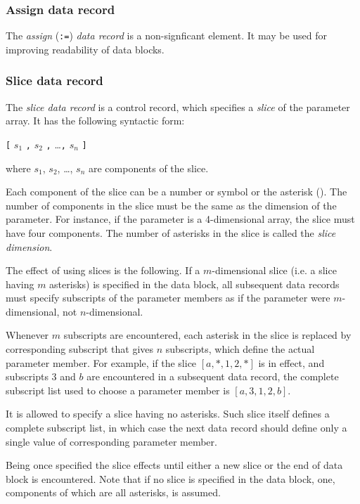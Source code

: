 \documentclass[10pt]{article}
\begin{document}
\subsubsection{Assign data record}

The {\it assign} ({\tt:=}) {\it data record} is a non-signficant
element. It may be used for improving readability of data blocks.

\subsubsection{Slice data record}

The {\it slice data record} is a control record, which specifies a
{\it slice} of the parameter array. It has the following syntactic form:

\medskip

\noindent\hfil
{\tt[} $s_1$ {\tt,} $s_2$ {\tt,} \dots {\tt,} $s_n$ {\tt]}

\medskip

\noindent where $s_1$, $s_2$, \dots, $s_n$ are components of the slice.

Each component of the slice can be a number or symbol or the asterisk
({\tt*}). The number of components in the slice must be the same as the
dimension of the parameter. For instance, if the parameter is a
4-dimensional array, the slice must have four components. The number of
asterisks in the slice is called the {\it slice dimension}.

The effect of using slices is the following. If a $m$-dimensional slice
(i.e. a slice having $m$ asterisks) is specified in the data block, all
subsequent data records must specify subscripts of the parameter
members as if the parameter were $m$-dimensional, not $n$-dimensional.

Whenever $m$ subscripts are encountered, each asterisk in the slice is
replaced by corresponding subscript that gives $n$ subscripts, which
define the actual parameter member. For example, if the slice
$[a,*,1,2,*]$ is in effect, and subscripts 3 and $b$ are encountered in
a subsequent data record, the complete subscript list used to choose a
parameter member is $[a,3,1,2,b]$.

It is allowed to specify a slice having no asterisks. Such slice itself
defines a complete subscript list, in which case the next data record
should define only a single value of corresponding parameter member.

Being once specified the slice effects until either a new slice or the
end of data block is encountered. Note that if no slice is specified in
the data block, one, components of which are all asterisks, is assumed.
\end{document}
